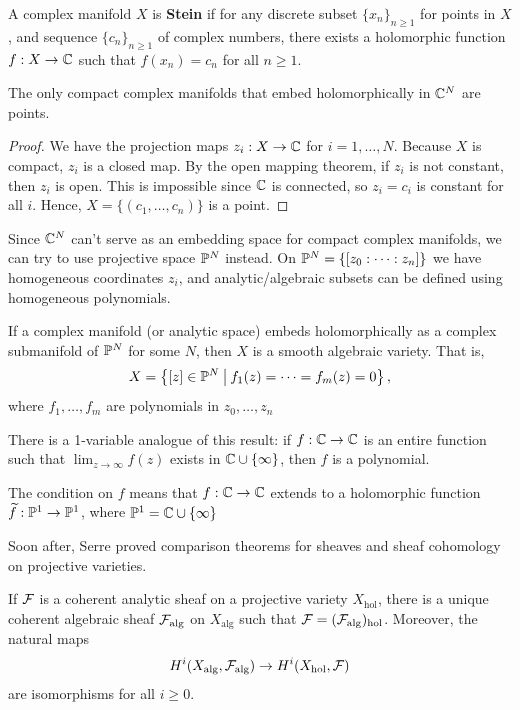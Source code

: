 \documentclass[11pt]{article}
\begin{document}
\begin{defn}
    A complex manifold $X$ is \textbf{Stein} if for any discrete subset $\{x_n\}_{n \geq 1}$ for points in $X$, and sequence $\{c_n\}_{n\geq1}$ of complex numbers, there exists a holomorphic function $f:X \to \mathbb{C}$ such that $f(x_n) =c_n$ for all $n \geq 1$.
\end{defn}

\begin{thm}
    The only compact complex manifolds that embed holomorphically in $\mathbb{C}^N$ are points.
\end{thm}

\begin{proof}
    We have the projection maps $z_i:X \to \mathbb{C}$ for $i=1,\dots,N$. Because $X$ is compact, $z_i$ is a closed map. By the open mapping theorem, if $z_i$ is not constant, then $z_i$ is open. This is impossible since $\mathbb{C}$ is connected, so $z_i=c_i$ is constant for all $i$. Hence, $X=\{(c_1,\dots,c_n)\}$ is a point.
\end{proof}

Since $\mathbb{C}^N$ can't serve as an embedding space for compact complex manifolds, we can try to use projective space $\mathbb P^N$ instead. On $\mathbb P^N = \left \{ [z_0:\cdots :z_n] \right \}$ we have homogeneous coordinates $z_i$, and analytic/algebraic subsets can be defined using homogeneous polynomials.

\begin{thm}
    If a complex manifold (or analytic space) embeds holomorphically as a complex submanifold of $\mathbb P^N$ for some $N$, then $X$ is a smooth algebraic variety. That is,
    $$X = \left \{  [z] \in \mathbb P^N \: \middle |\: f_1(z) =\cdots = f_m(z) = 0 \right \},$$
    where $f_1,\dots,f_m$ are polynomials in $z_0,\dots,z_n$
\end{thm}

\begin{rmk}
    There is a 1-variable analogue of this result: if $f:\mathbb{C} \to \mathbb{C}$ is an entire function such that $\lim_{z \to \infty}f(z)$ exists in $\mathbb{C} \cup \{\infty\}$, then $f$ is a polynomial.

    The condition on $f$ means that $f:\mathbb{C} \to \mathbb{C}$ extends to a holomorphic function $\widetilde f:\mathbb P^1 \to \mathbb P^1$, where $\mathbb P^1 = \mathbb{C} \cup \{\infty\}$
\end{rmk}

Soon after, Serre proved comparison theorems for sheaves and sheaf cohomology on projective varieties.

\begin{thm}
    If $\mathcal F$ is a coherent analytic sheaf on a projective variety $X_{\text{hol}}$, there is a unique coherent algebraic sheaf $\mathcal F_{\text{alg}}$ on $X_{\text{alg}}$ such that $\mathcal F = (\mathcal F_{\text{alg}})_{\text{hol}}$. Moreover, the natural maps
    $$H^{i}(X_{\text{alg}}, \mathcal F_{\text{alg}}) \to H^i(X_{\text{hol}},\mathcal F)$$
    are isomorphisms for all $i \geq 0$.
\end{thm}
\end{document}
